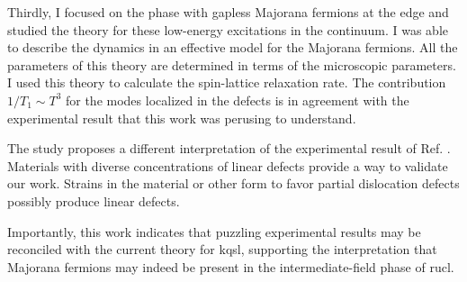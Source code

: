 Thirdly, I focused on the phase with gapless Majorana fermions at the edge and studied the theory for these low-energy excitations in the continuum. I was able to describe the dynamics in an effective model for the Majorana fermions. All the parameters of this theory are determined in terms of the microscopic parameters. I used this theory to calculate the spin-lattice relaxation rate. The contribution $1/T_1 \sim T^3$ for the modes localized in the defects is in agreement with the experimental result that this work was perusing to understand.

 
The study proposes a different%
 interpretation of the experimental result of Ref. \cite{Zheng-gapless2017}. Materials with diverse concentrations of linear defects provide a way to validate our work. Strains in the material or other form to favor partial dislocation defects possibly produce linear defects.

Importantly, this work indicates that puzzling experimental results may be reconciled with the current theory for \acrshort{kqsl}, supporting the interpretation that Majorana fermions may indeed be present in the intermediate-field phase of \acrshort{rucl}.
